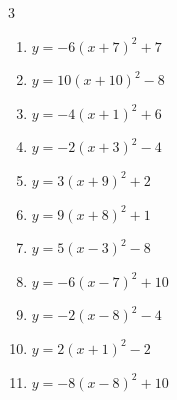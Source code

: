 \begin{multicols}{3}
\begin{enumerate}
        \phantom{$\displaystyle 頂点\left( 3 , -1 \right)$}

  \item $\displaystyle y=-6\left( x+7\right)^{2}+7$

        \phantom{$\displaystyle 頂点\left( -7 , 7 \right)$}

  \item $\displaystyle y=10\left( x+10\right)^{2}-8$

        \phantom{$\displaystyle 頂点\left( -10 , -8 \right)$}

  \item $\displaystyle y=-4\left( x+1\right)^{2}+6$

        \phantom{$\displaystyle 頂点\left( -1 , 6 \right)$}

  \item $\displaystyle y=-2\left( x+3\right)^{2}-4$

        \phantom{$\displaystyle 頂点\left( -3 , -4 \right)$}

  \item $\displaystyle y=3\left( x+9\right)^{2}+2$

        \phantom{$\displaystyle 頂点\left( -9 , 2 \right)$}

  \item $\displaystyle y=9\left( x+8\right)^{2}+1$

        \phantom{$\displaystyle 頂点\left( -8 , 1 \right)$}

  \item $\displaystyle y=5\left( x-3\right)^{2}-8$

        \phantom{$\displaystyle 頂点\left( 3 , -8 \right)$}

  \item $\displaystyle y=-6\left( x-7\right)^{2}+10$

        \phantom{$\displaystyle 頂点\left( 7 , 10 \right)$}

  \item $\displaystyle y=-2\left( x-8\right)^{2}-4$

        \phantom{$\displaystyle 頂点\left( 8 , -4 \right)$}

\columnbreak %

  \item $\displaystyle y=2\left( x+1\right)^{2}-2$

        \phantom{$\displaystyle 頂点\left( -1 , -2 \right)$}

  \item $\displaystyle y=-8\left( x-8\right)^{2}+10$


\end{enumerate}
\end{multicols}

